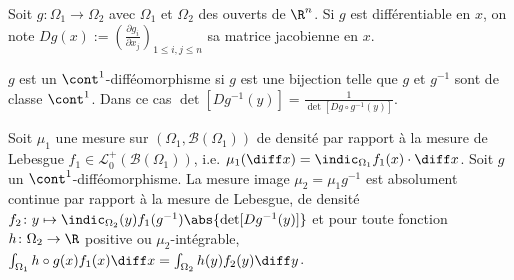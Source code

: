 	Soit $g \colon \Omega_1 \to \Omega_2$ avec $\Omega_1$ et $\Omega_2$ des ouverts de $\R^n$.
	Si $g$ est différentiable en $x$, on note $Dg(x) := \left( \frac{\partial g_i}{\partial x_j} \right)_{1 \leq i,j \leq n}$ sa matrice jacobienne en $x$.

	$g$ est un $\cont^1$-difféomorphisme si $g$ est une bijection telle que $g$ et $g^{-1}$ sont de classe $\cont^1$.
	Dans ce cas $\det[Dg^{-1}(y)] = \frac{1}{\det[Dg \circ g^{-1}(y)]}$.

	\begin{thm}
		Soit $\mu_1$ une mesure sur $(\Omega_1, \mathcal{B}(\Omega_1))$ de densité par rapport à la mesure de Lebesgue $f_1 \in \mathcal{L}_0^+(\mathcal{B}(\Omega_1))$, i.e. $\mu_1(\diff x) = \indic_{\Omega_1} f_1(x) \cdot \diff  x$.
		Soit $g$ un $\cont^1$-difféomorphisme.
		La mesure image $\mu_2 = \mu_1 g^{-1}$ est absolument continue par rapport à la mesure de Lebesgue, de densité $f_2 \colon y \mapsto \indic_{\Omega_2}(y) f_1 (g^{-1}) \abs{\det[D g^{-1}(y)]}$ et pour toute fonction $h \colon \Omega_2 \to \R$ positive ou $\mu_2$-intégrable, $\int_{\Omega_1} h \circ g(x) f_1(x) \diff x = \int_{\Omega_2} h(y) f_2(y) \diff y$.
	\end{thm}
